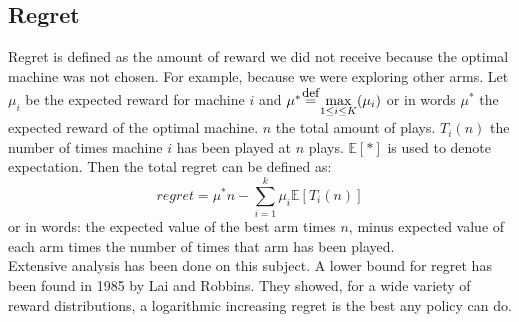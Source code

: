 \documentclass[11pt,a4paper]{article}
\newcommand\defeq{\stackrel{\mathclap{\small\mbox{def}}}{=}}
\newcommand\IE{\mathbb{E}}
\begin{document}
\subsection{Regret}
Regret is defined as the amount of reward we did not receive because the optimal machine was not chosen. For example, because we were exploring other arms. Let $\mu_i$ be the expected reward for machine $i$ and $\mu^{*} \defeq \max\limits_{1 \leq i \leq K} (\mu_i)$ or in words $\mu^{*}$ the expected reward of the optimal machine. $n$ the total amount of plays. $T_i(n)$ the number of times machine $i$ has been played at $n$ plays. $\IE[*]$ is used to denote expectation. Then the total regret can be defined as:
\[
    regret = \mu^*n - \sum_{i=1}^{k}\mu_i\IE[T_i(n)]
\]
or in words: the expected value of the best arm times $n$, minus expected value of each arm times the number of times that arm has been played.\\

Extensive analysis has been done on this subject. A lower bound for regret has been found in 1985 by Lai and Robbins\cite{Lai+Robbins:1985}. They showed, for a wide variety of reward distributions, a logarithmic increasing regret is the best any policy can do. 
\end{document}
